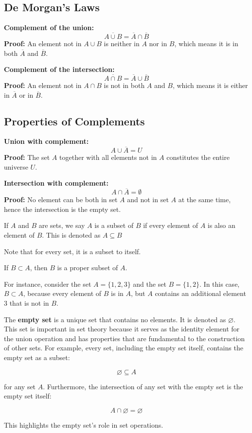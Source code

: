 \documentclass[
	12pt, %
	fleqn, %
	a4paper, %
]{LegrandOrangeBook}
\begin{document}
\subsection*{De Morgan's Laws}
\textbf{Complement of the union:}
\[
\overline{A \cup B} = \overline{A} \cap \overline{B}
\]
\textbf{Proof:} 
An element not in \( A \cup B \) is neither in \( A \) nor in \( B \), which means it is in both \( \overline{A} \) and \( \overline{B} \).

\textbf{Complement of the intersection:}
\[
\overline{A \cap B} = \overline{A} \cup \overline{B}
\]
\textbf{Proof:} 
An element not in \( A \cap B \) is not in both \( A \) and \( B \), which means it is either in \( \overline{A} \) or in \( \overline{B} \).

\subsection*{Properties of Complements}
\textbf{Union with complement:}
\[
A \cup \overline{A} = U
\]
\textbf{Proof:} 
The set \( A \) together with all elements not in \( A \) constitutes the entire universe \( U \).

\textbf{Intersection with complement:}
\[
A \cap \overline{A} = \emptyset
\]
\textbf{Proof:} 
No element can be both in set \( A \) and not in set \( A \) at the same time, hence the intersection is the empty set.

\begin{definition}[Subset]
    If $A$ and $B$ are sets, we say $A$ is a subset of $B$ if every element of $A$ is also an element of $B$. This is denoted as \(A \subseteq B\)  
\end{definition}
\begin{remark}
    Note that for every set, it is a subset to itself.
\end{remark}
\begin{definition}
    If \( B \subset A \), then \( B \) is a proper subset of \( A \).
\end{definition}
For instance, consider the set \( A = \{1, 2, 3\} \) and the set \( B = \{1, 2\} \). In this case, \( B \subset A \), because every element of \( B \) is in \( A \), but \( A \) contains an additional element \( 3 \) that is not in \( B \).
\begin{definition}
    The \textbf{empty set} is a unique set that contains no elements. It is denoted as \( \varnothing \). This set is important in set theory because it serves as the identity element for the union operation and has properties that are fundamental to the construction of other sets. For example, every set, including the empty set itself, contains the empty set as a subset:

\[ \varnothing \subseteq A \]

for any set \( A \). Furthermore, the intersection of any set with the empty set is the empty set itself:

\[ A \cap \varnothing = \varnothing \]

This highlights the empty set's role in set operations.
\end{definition}
\end{document}
